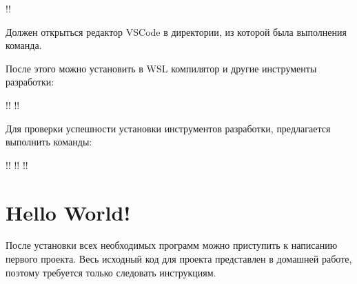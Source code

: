 \documentclass[14pt]{extarticle}
\begin{document}
\vspace{2mm}

\begin{consolewindow}[\normalsize]
!!
\end{consolewindow}

\vspace{2mm}

Должен открыться редактор VSCode в директории, из которой была выполнения команда.

После этого можно установить в WSL компилятор и другие инструменты разработки:

\vspace{2mm}

\begin{consolewindow}[\normalsize]
!!
!!
\end{consolewindow}

\vspace{2mm}

Для проверки успешности установки инструментов разработки, предлагается выполнить команды:

\vspace{2mm}

\begin{consolewindow}[\normalsize]
!!
!!
!!
\end{consolewindow}

\section{Hello World!}

После установки всех необходимых программ можно приступить к написанию первого проекта.
Весь исходный код для проекта представлен в домашней работе, поэтому требуется только следовать
инструкциям.
\end{document}
